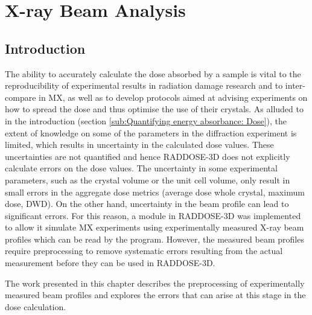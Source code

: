 \chapter{X-ray Beam Analysis}
\label{chap:X-ray Beam Analysis}

\section{Introduction}
\label{sec:Introduction - Beam chapter}
The ability to accurately calculate the dose absorbed by a sample is vital to the reproducibility of experimental results in radiation damage research and to inter-compare in MX, as well as to develop protocols aimed at advising experiments on how to spread the dose and thus optimise the use of their crystals.
As alluded to in the introduction (section \ref{sub:Quantifying energy absorbance: Dose}), the extent of knowledge on some of the parameters in the diffraction experiment is limited, which results in uncertainty in the calculated dose values.
These uncertainties are not quantified and hence RADDOSE-3D does not explicitly calculate errors on the dose values.
The uncertainty in some experimental parameters, such as the crystal volume or the unit cell volume, only result in small errors in the aggregate dose metrics (average dose whole crystal, maximum dose, DWD).
On the other hand, uncertainty in the beam profile can lead to significant errors.
For this reason, a module in RADDOSE-3D was implemented to allow it simulate MX experiments using experimentally measured X-ray beam profiles which can be read by the program.
However, the measured beam profiles require preprocessing to remove systematic errors resulting from the actual measurement before they can be used in RADDOSE-3D.

The work presented in this chapter describes the preprocessing of experimentally measured beam profiles and explores the errors that can arise at this stage in the dose calculation.
